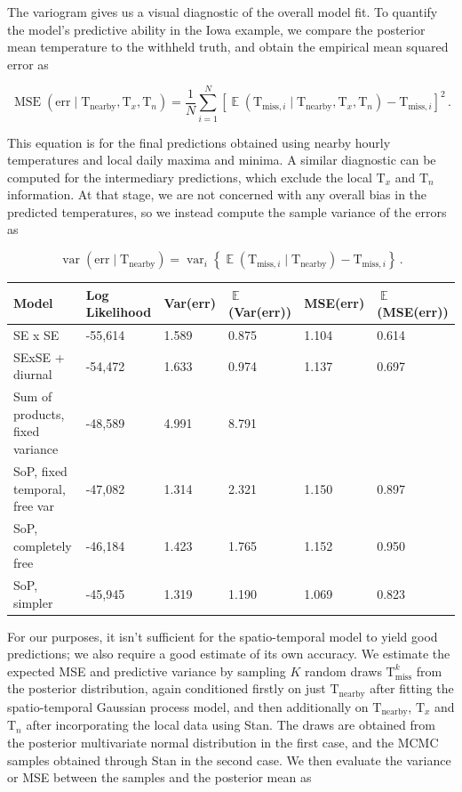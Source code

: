 \documentclass[letter]{article}
\newcommand{\genericdel}[3]{%
      \left#1#3\right#2
    }
\newcommand{\del}[1]{\genericdel(){#1}}
\newcommand{\sbr}[1]{\genericdel[]{#1}}
\newcommand{\cbr}[1]{\genericdel\{\}{#1}}
\DeclareMathOperator{\E}{\mathbb{E}}
\DeclareMathOperator{\var}{{var}}
\DeclareMathOperator{\mse}{{MSE}}
\newcommand{\T}{\mathrm{T}}
\newcommand{\Tn}{\T_{n}}
\newcommand{\Tx}{\T_{x}}
\newcommand{\miss}{\mathrm{miss}}
\newcommand{\obs}{\mathrm{nearby}}
\newcommand{\error}{\mathrm{err}}
\begin{document}
The variogram gives us a visual diagnostic of the overall model fit. To
quantify the model's predictive ability in the Iowa example, we compare
the posterior mean temperature to the withheld truth, and obtain the
empirical mean squared error as

\begin{equation}
    \label{eq:mse}
    \mse\del{\error \mid \T_\obs,\Tx,\Tn} = \frac{1}{N} \sum_{i=1}^N \sbr{\E\del{\T_{\miss,i} \mid \T_\obs,\Tx,\Tn} - \T_{\miss,i}}^2\,.
\end{equation}

This equation is for the final predictions obtained using nearby hourly
temperatures and local daily maxima and minima. A similar diagnostic can
be computed for the intermediary predictions, which exclude the local
\(\Tx\) and \(\Tn\) information. At that stage, we are not concerned
with any overall bias in the predicted temperatures, so we instead
compute the sample variance of the errors as

\begin{equation}
    \label{eq:varerr}
    \var\del{\error \mid \T_\obs} = \var_i \cbr{\E\del{\T_{\miss,i} \mid \T_\obs} - \T_{\miss,i}}\,.
\end{equation}

\begin{longtable}[]{@{}llllll@{}}
\toprule
Model & Log Likelihood & Var(err) & \(\E\)(Var(err)) & MSE(err) &
\(\E\)(MSE(err))\tabularnewline
\midrule
\endhead
SE x SE & -55,614 & 1.589 & 0.875 & 1.104 & 0.614\tabularnewline
SExSE + diurnal & -54,472 & 1.633 & 0.974 & 1.137 & 0.697\tabularnewline
Sum of products, fixed variance & -48,589 & 4.991 & 8.791 &
&\tabularnewline
SoP, fixed temporal, free var & -47,082 & 1.314 & 2.321 & 1.150 &
0.897\tabularnewline
SoP, completely free & -46,184 & 1.423 & 1.765 & 1.152 &
0.950\tabularnewline
SoP, simpler & -45,945 & 1.319 & 1.190 & 1.069 & 0.823\tabularnewline
\bottomrule
\end{longtable}

For our purposes, it isn't sufficient for the spatio-temporal model to
yield good predictions; we also require a good estimate of its own
accuracy. We estimate the expected MSE and predictive variance by
sampling \(K\) random draws \(\T^k_\miss\) from the posterior
distribution, again conditioned firstly on just \(\T_\obs\) after
fitting the spatio-temporal Gaussian process model, and then
additionally on \(\T_\obs\), \(\Tx\) and \(\Tn\) after incorporating the
local data using Stan. The draws are obtained from the posterior
multivariate normal distribution in the first case, and the MCMC samples
obtained through Stan in the second case. We then evaluate the variance
or MSE between the samples and the posterior mean as
\end{document}
